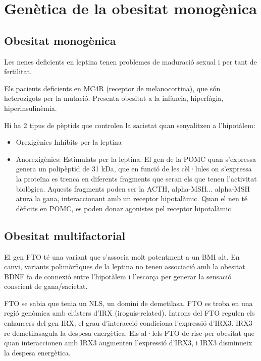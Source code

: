 \section{Genètica de la obesitat monogènica}
\label{sec:genetica-de-la}

\subsection{Obesitat monogènica}
\label{subsec:obesitat-monogenica}
Les nenes deficients en leptina tenen problemes de maduració sexual i per tant de fertilitat.

Els pacients deficients en MC4R (receptor de melanocortina), que són heterozigots per la mutació. Presenta obesitat a la infància, hiperfàgia, hiperinsulinèmia.

Hi ha 2 tipus de pèptids que controlen la sacietat quan senyalitzen a l'hipotàlem:
\begin{itemize}
\item Orexigènics Inhibits per la leptina
\item Anorexigènics: Estimulats per la leptina. El gen de la POMC quan s'expressa genera un polipèptid de 31 kDa, que en funció de les cèl·lules on s'expressa la proteïna es trenca en diferents fragments que seran els que tenen l'activitat biològica. Aquests fragments poden ser la ACTH, alpha-MSH... alpha-MSH atura la gana, interaccionant amb un receptor hipotalàmic. Quan el nen té dèficits en POMC, es poden donar agonistes pel receptor hipotalàmic.
\end{itemize}

\subsection{Obesitat multifactorial}
\label{subsec:obes-mult}


El gen FTO té una variant que s'associa molt potentment a un BMI alt. En canvi, variants polimòrfiques de la leptina no tenen associació amb la obesitat. BDNF fa de connexió entre l'hipotàlem i l'escorça per generar la sensació conscient de gana/sacietat.

FTO se sabia que tenia un NLS, un domini de demetilasa. FTO es troba en una regió genòmica amb clústers d'IRX (iroguis-related). Introns del FTO regulen els enhancers del gen IRX; el grau d'interacció condiciona l'expressió d'IRX3. IRX3 re demetilasagula la despesa energètica. Els al·lels FTO de risc per obesitat que quan interaccionen amb IRX3 augmenten l'expressió d'IRX3, i IRX3 disminueix la despesa energètica.